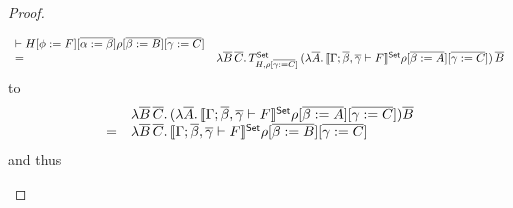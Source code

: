 \documentclass[acmsmall,review,anonymous]{acmart}
\theoremstyle{definition}
\newcommand{\set}{\mathsf{Set}}
\begin{document}
\begin{proof}
\begin{itemize}
\[\begin{array}{ll}
{  \vdash H[\phi := F][\ol{\alpha := \beta}]}\rho[\ol{\beta :=
    B}][\ol{\gamma := C}]\\
= & \lambda \ol{B}\,\ol{C}.\,T^\set_{H,\rho[\ol{\gamma:=
     C}]}\,(\lambda \ol{A}. \, \setsem{\Gamma;\ol{\beta},\ol{\gamma} 
  \vdash F}\rho[\ol{\beta := A}][\ol{\gamma := C}]) \, \ol{B}
\end{array}\]
to
\[\begin{array}{ll}
 & \lambda \ol{B}\,\ol{C}.\,(\lambda
\ol{A}.\,\setsem{\Gamma;\ol{\beta},\ol{\gamma} \vdash F}\rho[\ol{\beta
    := A}][\ol{\gamma := C}]) \ol{B}\\
= & \lambda
\ol{B}\,\ol{C}.\,\setsem{\Gamma;\ol{\beta},\ol{\gamma} \vdash
  F}\rho[\ol{\beta := B}][\ol{\gamma := C}]
\end{array}\]
and thus

\end{itemize}
\end{proof}
\end{document}
